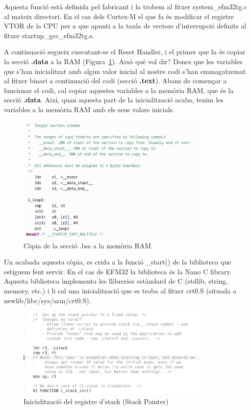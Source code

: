 Aquesta funció està definida pel fabricant i la trobem al fitxer system\_efm32tg.c
al mateix directori. En el cas dels Cortex-M el que fa és modificar el registre 
VTOR de la CPU per a que apunti a la taula de vectors d’interrupció definits 
al fitxer startup\_gcc\_efm32tg.s.

A continuació segueix executant-se el Reset Handler, i el primer que fa és 
copiar la secció {\bf .data} a la RAM (Figura~\ref{fig:copy_data_efm32}). Això què vol dir? Doncs que les variables 
que s’han inicialitzat amb algun valor inicial al nostre codi s’han 
emmagatzemat al fitxer binari a continuació del codi (secció {\bf .text}). 
Abans de començar a funcionar el codi, cal copiar aquestes variables a la 
memòria RAM, que és la secció {\bf .data}. Així, quan aquesta part de la 
inicialització acaba, tenim les variables a la memòria RAM amb els seus 
valors inicials.

\begin{figure}[h]
 \centering
 \includegraphics[width=0.85\textwidth, keepaspectratio]{imatges/copy_data_efm32.png}
 \caption{Còpia de la secció .bss a la memòria RAM}
 \label{fig:copy_data_efm32}
\end{figure}

Un acabada aquesta còpia, es crida a la funció \_start() de la biblioteca que 
estiguem fent servir. En el cas de EFM32 la biblioteca és la Nano C library. 
Aquesta biblioteca implementa les llibreries estàndard de C (stdlib, string, 
memory, etc.) i li cal una inicialització que es troba al fitxer crt0.S (situada 
a newlib/libc/sys/arm/crt0.S).

\begin{figure}
 \centering
 \includegraphics[width=0.85\textwidth, keepaspectratio]{imatges/crt0_setstack-1.png}
 \caption{Inicialització del registre d'stack (Stack Pointer)}
 \label{fig:crt0_setstack-1}
\end{figure}

